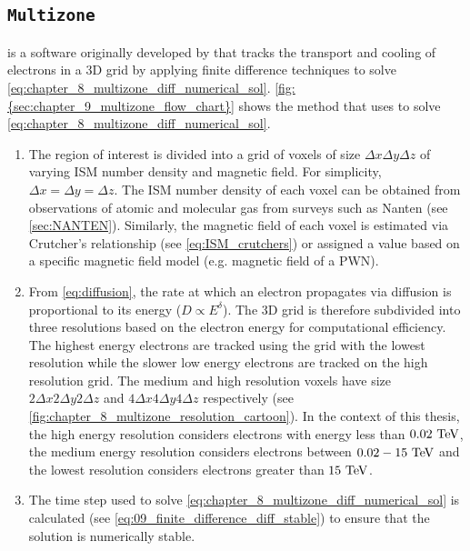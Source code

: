 \subsection{{\tt Multizone}} \label{sec:09_multizone_steps}

\multizone is a software originally developed by \cite{fabien} that tracks the transport and cooling of electrons in a 3D grid by applying finite difference techniques to solve \autoref{eq:chapter_8_multizone_diff_numerical_sol}. \autoref{fig:{sec:chapter_9_multizone_flow_chart}} shows the method that \multizone uses to solve \autoref{eq:chapter_8_multizone_diff_numerical_sol}.

\begin{enumerate}[label=\textbf{\arabic*}.]
\itemsep0em
\item The region of interest is divided into a grid of voxels of size $\Delta x\Delta y\Delta z$ of varying ISM number density and magnetic field. For simplicity, $\Delta x=\Delta y=\Delta z$. The ISM number density of each voxel can be obtained from observations of atomic and molecular gas from surveys such as Nanten (see \autoref{sec:NANTEN}). Similarly, the magnetic field of each voxel is estimated via Crutcher's relationship (see \autoref{eq:ISM_crutchers}) or assigned a value based on a specific magnetic field model (e.g. magnetic field of a PWN).
\item From \autoref{eq:diffusion}, the rate at which an electron propagates via diffusion is proportional to its energy ($D\propto E^\delta$). The 3D grid is therefore subdivided into three resolutions based on the electron energy for computational efficiency. The highest energy electrons are tracked using the grid with the lowest resolution while the slower low energy electrons are tracked on the high resolution grid. The medium and high resolution voxels have size $2\Delta x2\Delta y2\Delta z$ and $4\Delta x4\Delta y4\Delta z$ respectively (see \autoref{fig:chapter_8_multizone_resolution_cartoon}). In the context of this thesis, the high energy resolution considers electrons with energy less than $0.02~\TeV$, the medium energy resolution considers electrons between $0.02-15~\TeV$ and the lowest resolution considers electrons greater than $15~\TeV$.
\item The time step used to solve \autoref{eq:chapter_8_multizone_diff_numerical_sol} is calculated (see \autoref{eq:09_finite_difference_diff_stable}) to ensure that the solution is numerically stable.
\setcounter{counter1}{\value{enumi}}
\end{enumerate}
